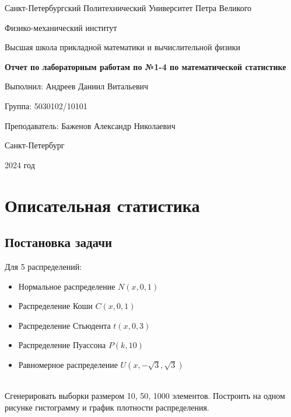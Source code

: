 \documentclass[14pt]{extarticle}
\begin{document}
\pagestyle{empty}
\begin{center}
    Санкт-Петербургский Политехнический Университет Петра Великого

    \vspace{0.3cm}

    Физико-механический институт

    \vspace{0.3cm}

    Высшая школа прикладной математики и вычислительной физики

    \vspace{3cm}

    {\large\textbf{Отчет по лабораторным работам по №1-4 по математической статистике}}

    \vspace{4.5cm}

    Выполнил: \hspace{5.5cm}Андреев Даниил Витальевич

    Группа: \hspace{9.5cm}5030102/10101

    Преподаватель: \hspace{3.6cm}Баженов Александр Николаевич

    \vspace{4cm}

    Санкт-Петербург

    2024 год
\end{center}

\newpage

\section{Описательная статистика}
\subsection{Постановка задачи}
Для 5 распределений:

\begin{itemize}
    \item Нормальное распределение \(N(x, 0, 1)\)
    \item Распределение Коши \(C(x, 0, 1)\)
    \item Распределение Стьюдента \(t(x, 0, 3)\)
    \item Распределение Пуассона \(P(k, 10)\)
    \item Равномерное распределение \(U(x,-\sqrt{3}, \sqrt{3})\)
\end{itemize}\\
Сгенерировать выборки размером 10, 50, 1000 элементов. Построить на одном рисунке гистограмму и график плотности распределения.
\end{document}
